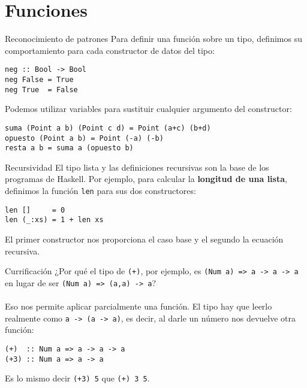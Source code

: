 \section{Funciones}

\begin{frame}[fragile]{Reconocimiento de patrones}
  Para definir una función sobre un tipo, definimos su comportamiento para cada
  constructor de datos del tipo:

  \espacio

  \begin{lstlisting}
neg :: Bool -> Bool
neg False = True
neg True  = False
  \end{lstlisting}

  \espacio
  
  Podemos utilizar variables para sustituir cualquier argumento del constructor:

  \espacio

  \begin{lstlisting}
suma (Point a b) (Point c d) = Point (a+c) (b+d)
opuesto (Point a b) = Point (-a) (-b)
resta a b = suma a (opuesto b)
  \end{lstlisting}
\end{frame}

\begin{frame}[fragile]{Recursividad}
  El tipo lista y las definiciones recursivas son la base de los programas de Haskell.
  Por ejemplo, para calcular la \textbf{longitud de una lista}, definimos la función
  \texttt{len} para sus dos constructores:

  \espacio

  \begin{lstlisting}
len []     = 0
len (_:xs) = 1 + len xs
  \end{lstlisting}

    \espacio

  El primer constructor nos proporciona el caso base y el segundo la ecuación recursiva.
\end{frame}

\begin{frame}[fragile]{Currificación}
  ¿Por qué el tipo de \texttt{(+)}, por ejemplo, es \texttt{(Num a) => a -> a -> a} en lugar de
  ser \texttt{(Num a) => (a,a) -> a}?
  \\~\\
  Eso nos permite aplicar parcialmente una función. El tipo hay que leerlo realmente como
  \texttt{a -> (a -> a)}, es decir, al darle un número nos devuelve otra función:
    \begin{lstlisting}
(+)  :: Num a => a -> a -> a
(+3) :: Num a => a -> a
  \end{lstlisting}
  Es lo mismo decir \texttt{(+3) 5} que \texttt{(+) 3 5}.
\end{frame}


